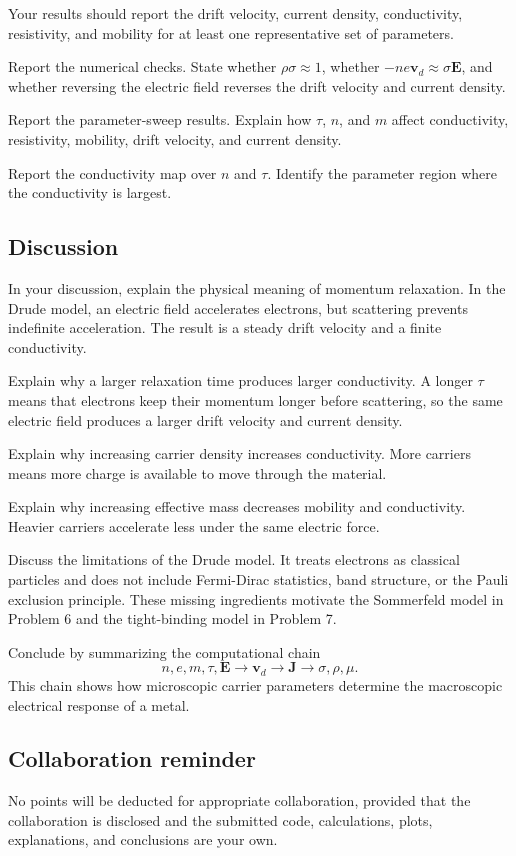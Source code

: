 Your results should report the drift velocity, current density, conductivity, resistivity, and mobility for at least one representative set of parameters.

Report the numerical checks. State whether \(\rho\sigma\approx1\), whether \(-ne\mathbf v_d\approx\sigma\mathbf E\), and whether reversing the electric field reverses the drift velocity and current density.

Report the parameter-sweep results. Explain how \(\tau\), \(n\), and \(m\) affect conductivity, resistivity, mobility, drift velocity, and current density.

Report the conductivity map over \(n\) and \(\tau\). Identify the parameter region where the conductivity is largest.

\subsection{Discussion}

In your discussion, explain the physical meaning of momentum relaxation. In the Drude model, an electric field accelerates electrons, but scattering prevents indefinite acceleration. The result is a steady drift velocity and a finite conductivity.

Explain why a larger relaxation time produces larger conductivity. A longer \(\tau\) means that electrons keep their momentum longer before scattering, so the same electric field produces a larger drift velocity and current density.

Explain why increasing carrier density increases conductivity. More carriers means more charge is available to move through the material.

Explain why increasing effective mass decreases mobility and conductivity. Heavier carriers accelerate less under the same electric force.

Discuss the limitations of the Drude model. It treats electrons as classical particles and does not include Fermi-Dirac statistics, band structure, or the Pauli exclusion principle. These missing ingredients motivate the Sommerfeld model in Problem 6 and the tight-binding model in Problem 7.

Conclude by summarizing the computational chain
\[
n,e,m,\tau,\mathbf E
\longrightarrow
\mathbf v_d
\longrightarrow
\mathbf J
\longrightarrow
\sigma,\rho,\mu.
\]
This chain shows how microscopic carrier parameters determine the macroscopic electrical response of a metal.

\subsection{Collaboration reminder}

No points will be deducted for appropriate collaboration, provided that the collaboration is disclosed and the submitted code, calculations, plots, explanations, and conclusions are your own.